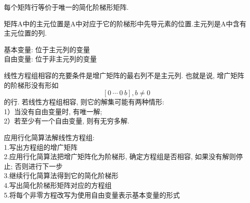 \begin{TheoremTwo}[简化阶梯形矩阵的唯一性]
每个矩阵行等价于唯一的简化阶梯形矩阵.
\end{TheoremTwo}\vspace{2ex}

\begin{definition}
矩阵A中的{\heiti 主元位置}是A中对应于它的阶梯形中先导元素的位置.{\heiti 主元列}是A中含有主元位置的列.
\end{definition}\vspace{2ex}

基本变量: 位于主元列的变量\\
自由变量: 位于非主元列的变量\\[2ex]

\begin{TheoremTwo}[存在与唯一性定理]
线性方程组相容的充要条件是增广矩阵的最右列不是主元列. 也就是说, 增广矩阵的阶梯形没有形如
	\[[0\ \cdots\ 0\ b], b\neq 0\]
的行. 若线性方程组相容, 则它的解集可能有两种情形:\\
1）当没有自由变量时, 有唯一解;\\
2）若至少有一个自由变量, 则有无穷多解.
\end{TheoremTwo}\vspace{2ex}

应用行化简算法解线性方程组:\\
1.写出方程组的增广矩阵\\
2.应用行化简算法把增广矩阵化为阶梯形, 确定方程组是否相容, 如果没有解则停止; 否则进行下一步\\
3.继续行化简算法得到它的简化阶梯形\\
4.写出简化阶梯形矩阵对应的方程组\\
5.将每个非零方程改写为使用自由变量表示基本变量的形式\\[4ex]

